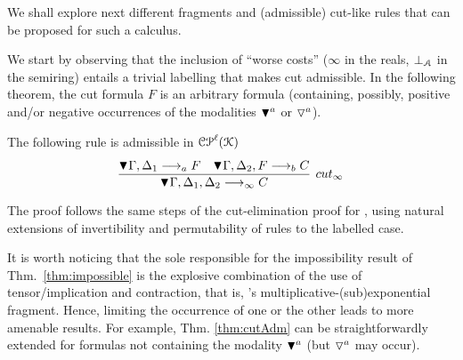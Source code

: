 We shall explore next
different fragments and (admissible) cut-like rules that can be proposed for such a calculus. 

We start by observing that the inclusion of ``worse costs''  ($\infty$ in the reals, $\bot_{\mathcal{A}}$ in the semiring) entails a trivial labelling 
that makes cut admissible. In the following theorem,  the cut formula $F$ is an arbitrary formula (containing, possibly, positive and/or negative occurrences of 
the modalities $\blacktriangledown^{a}$ or $\triangledown^{a}$). 

\begin{theorem}
The following rule is admissible in $\mathcal{CP}^\ell(\mathcal{K})$
\[
\infer[cut_\infty]{\pnbang{}\Gamma,\Delta_1,\Delta_2 \lraS{\infty} C}{
 \deduce{\pnbang{}\Gamma,\Delta_1 \lraS{a} F}{}&
  \deduce{\pnbang{}\Gamma,\Delta_2, F \lraS{b} C}{}
 }
\]
\end{theorem}
The proof follows the same steps of the cut-elimination proof for \SELL, 
using natural extensions of invertibility and permutability of rules to the labelled case.

It is worth noticing that the sole responsible for the impossibility result of Thm.~\ref{thm:impossible} is the explosive combination of the use of tensor/implication and contraction, that is, \SELL's multiplicative-(sub)exponential fragment. Hence, limiting the occurrence of one or the other leads to more amenable results.
For example, Thm. \ref{thm:cutAdm} can be straightforwardly 
extended for 
formulas not containing the modality $\blacktriangledown^{a}$ (but $\triangledown^{a}$ may occur). 

